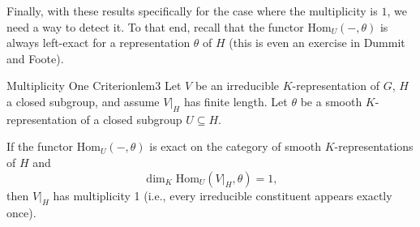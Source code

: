 \documentclass{article}
\newcommand{\qn}{\quad\newline}
\begin{document}
%
%

Finally, with these results specifically for the case where the multiplicity is $1$, we need a way to detect
it. To that end, recall that the functor $\mathrm{Hom}_U(-, \theta)$ is always left-exact for a representation
$\theta$ of $H$ (this is even an exercise in Dummit and Foote).

\begin{lem}{Multiplicity One Criterion}{lem3}
  Let $V$ be an irreducible $K$-representation of $G$, $H$ a closed subgroup, and assume $V|_H$ has finite length.
  Let $\theta$ be a smooth $K$-representation of a closed subgroup $U \subseteq H$.

  \qn
  If the functor $\mathrm{Hom}_U(-, \theta)$ is exact on the category of smooth $K$-representations of $H$ and
  \[ \dim_K \mathrm{Hom}_U(V|_H, \theta) = 1, \]
  then $V|_H$ has multiplicity 1 (i.e., every irreducible constituent appears exactly once).
\end{lem}
\end{document}
